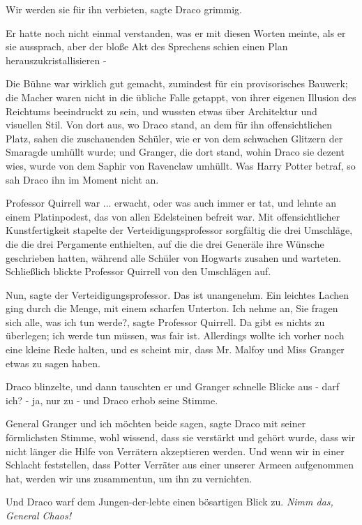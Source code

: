 \glqq{}Wir werden sie für ihn verbieten\grqq{}, sagte Draco grimmig.

Er hatte noch nicht einmal verstanden, was er mit diesen Worten meinte, als er
sie aussprach, aber der bloße Akt des Sprechens schien einen Plan
herauszukristallisieren -

Die Bühne war wirklich gut gemacht, zumindest für ein provisorisches Bauwerk;
die Macher waren nicht in die übliche Falle getappt, von ihrer eigenen Illusion
des Reichtums beeindruckt zu sein, und wussten etwas über Architektur und
visuellen Stil. Von dort aus, wo Draco stand, an dem für ihn offensichtlichen
Platz, sahen die zuschauenden Schüler, wie er von dem schwachen Glitzern der
Smaragde umhüllt wurde; und Granger, die dort stand, wohin Draco sie dezent
wies, wurde von dem Saphir von Ravenclaw umhüllt. Was Harry Potter betraf, so
sah Draco ihn im Moment nicht an.

Professor Quirrell war ... erwacht, oder was auch immer er tat, und lehnte an
einem Platinpodest, das von allen Edelsteinen befreit war. Mit offensichtlicher
Kunstfertigkeit stapelte der Verteidigungsprofessor sorgfältig die drei
Umschläge, die die drei Pergamente enthielten, auf die die drei Generäle ihre
Wünsche geschrieben hatten, während alle Schüler von Hogwarts zusahen und
warteten. Schließlich blickte Professor Quirrell von den Umschlägen auf.

\glqq{}Nun\grqq{}, sagte der Verteidigungsprofessor. \glqq{}Das ist unangenehm.\grqq{}
Ein leichtes Lachen ging durch die Menge, mit einem scharfen Unterton. \glqq{}Ich
nehme an, Sie fragen sich alle, was ich tun werde?\grqq{}, sagte Professor
Quirrell. \glqq{}Da gibt es nichts zu überlegen; ich werde tun müssen, was fair
ist. Allerdings wollte ich vorher noch eine kleine Rede halten, und es scheint
mir, dass Mr. Malfoy und Miss Granger etwas zu sagen haben.\grqq{}

Draco blinzelte, und dann tauschten er und Granger schnelle Blicke aus - darf
ich? - ja, nur zu - und Draco erhob seine Stimme.

\glqq{}General Granger und ich möchten beide sagen\grqq{}, sagte Draco mit seiner
förmlichsten Stimme, wohl wissend, dass sie verstärkt und gehört wurde, \glqq{}
dass wir nicht länger die Hilfe von Verrätern akzeptieren werden. Und wenn wir
in einer Schlacht feststellen, dass Potter Verräter aus einer unserer Armeen
aufgenommen hat, werden wir uns zusammentun, um ihn zu vernichten.\grqq{}

Und Draco warf dem Jungen-der-lebte einen bösartigen Blick zu.
\emph{Nimm das, General Chaos!}

